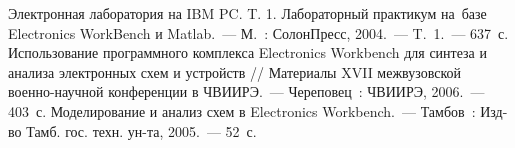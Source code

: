 \begin{thebibliography}{99}

\bibitem{} Электронная лаборатория на IBM PC. T. 1. Лабораторный практикум на~базе Electronics WorkBench и Matlab.~--- М.~: СолонПресс, 2004.~--- T.~1.~--- 637~с.
\bibitem{} Использование программного комплекса Electronics Workbench для синтеза и анализа электронных схем и устройств // Материалы XVII межвузовской военно-научной конференции в ЧВИИРЭ.~--- Череповец~: ЧВИИРЭ, 2006.~--- 403~с.
\bibitem{} Моделирование и анализ схем в Electronics Workbench.~--- Тамбов~: Изд-во Тамб. гос. техн. ун-та, 2005.~--- 52~с.


\end{thebibliography}
